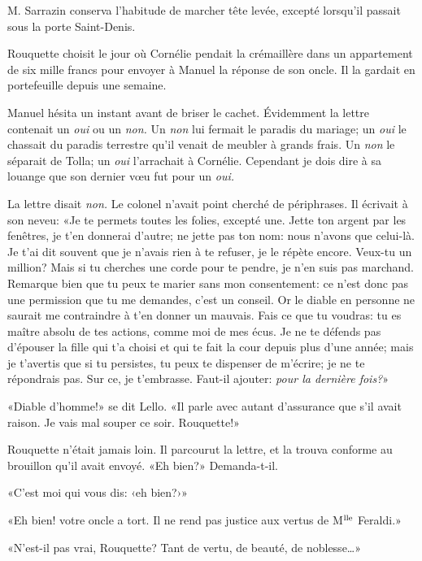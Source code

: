 \enlargethispage{\baselineskip}

M. Sarrazin conserva l'habitude de marcher tête levée, excepté lorsqu'il passait sous la porte Saint-Denis.

Rouquette choisit le jour où Cornélie pendait la crémaillère dans un appartement de six mille francs pour envoyer à Manuel la réponse de son oncle. Il la gardait en portefeuille depuis une semaine.

Manuel hésita un instant avant de briser le cachet. Évidemment la lettre contenait un \emph{oui} ou un \emph{non.} Un \emph{non} lui fermait le paradis du mariage; un \emph{oui} le chassait du paradis terrestre qu'il venait de meubler à grands frais. Un \emph{non} le séparait de Tolla; un \emph{oui} l'arrachait à Cornélie. Cependant je dois dire à sa louange que son dernier v\oe{}u fut pour un \emph{oui.}

La lettre disait \emph{non.} Le colonel n'avait point cherché de périphrases. Il écrivait à son neveu: «Je te permets toutes les folies, excepté une. Jette ton argent par les fenêtres, je t'en donnerai d'autre; ne jette pas ton nom: nous n'avons que celui-là. Je t'ai dit souvent que je n'avais rien à te refuser, je le répète encore. Veux-tu un million? Mais si tu cherches une corde pour te pendre, je n'en suis pas marchand. Remarque bien que tu peux te marier sans mon consentement: ce n'est donc pas une permission que tu me demandes, c'est un conseil. Or le diable en personne ne saurait me contraindre à t'en donner un mauvais. Fais ce que tu voudras: tu es maître absolu de tes actions, comme moi de mes écus. Je ne te défends pas d'épouser la fille qui t'a choisi et qui te fait la cour depuis plus d'une année; mais je t'avertis que si tu persistes, tu peux te dispenser de m'écrire; je ne te répondrais pas. Sur ce, je t'embrasse. Faut-il ajouter: \emph{pour la dernière fois?}»

«Diable d'homme!» se dit Lello. «Il parle avec autant d'assurance que s'il avait raison. Je vais mal souper ce soir. Rouquette!»

Rouquette n'était jamais loin. Il parcourut la lettre, et la trouva conforme au brouillon qu'il avait envoyé. «Eh bien?» Demanda-t-il.

«C'est moi qui vous dis: ‹eh bien?›»

«Eh bien! votre oncle a tort. Il ne rend pas justice aux vertus de M$\textsuperscript{lle}$ Feraldi.»

«N'est-il pas vrai, Rouquette? Tant de vertu, de beauté, de noblesse\ldots{}»

